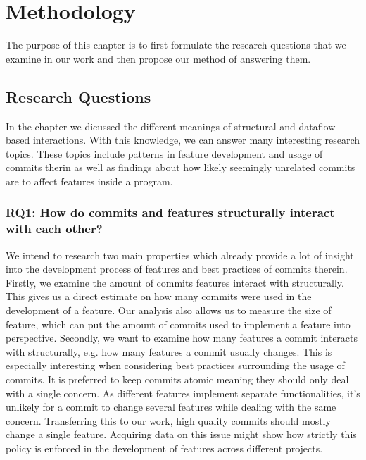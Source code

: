 \section{Methodology}\label{ch:methodology}

The purpose of this chapter is to first formulate the research questions that we examine in our work
and then propose our method of answering them.

\subsection{Research Questions}\label{sec:research_questions}

In the  chapter we dicussed the different meanings of structural and dataflow-based interactions.
With this knowledge, we can answer many interesting research topics. 
These topics include patterns in feature development and usage of commits therin as well as findings about how likely seemingly unrelated commits are to affect features inside a program.

\subsubsection*{\textbf{RQ1: How do commits and features structurally interact with each other?}}

We intend to research two main properties which already provide a lot of insight into the development process of features and best practices of commits therein.
Firstly, we examine the amount of commits features interact with structurally.
This gives us a direct estimate on how many commits were used in the development of a feature.
Our analysis also allows us to measure the size of feature, which can put the amount of commits used to implement a feature into perspective.
Secondly, we want to examine how many features a commit interacts with structurally, e.g. how many features a commit usually changes. 
This is especially interesting when considering best practices surrounding the usage of commits.
It is preferred to keep commits atomic\cite{hundhausen2021commit_metrics} meaning they should only deal with a single concern.
As different features implement separate functionalities, it's unlikely for a commit to change several features while dealing with the same concern.
Transferring this to our work, high quality commits should mostly change a single feature.
Acquiring data on this issue might show how strictly this policy is enforced in the development of features across different projects. 

